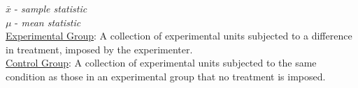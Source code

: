 \documentclass[11pt]{article}
\begin{document}
	$ \bar{x} $ - \textit{sample statistic}\\
	$ \mu $ - \textit{mean statistic}\\
	
	\underline{Experimental Group}: A collection of experimental units subjected to a difference in treatment, imposed by the experimenter.\\
	
	\underline{Control Group}: A collection of experimental units subjected to the same condition as those in an experimental group that no treatment is imposed.\\
	
	
	
	
	
	
	
	
	
	
	
	
	
	
	
	
	
	
	
	
	
	
	
	
	
	
	
	
	
	
	
	
\end{document}
